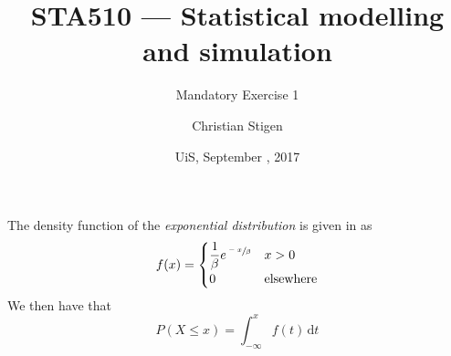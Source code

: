 \documentclass[a4paper,english,12pt]{article}
\title{STA510 --- Statistical modelling and simulation}
\subtitle{Mandatory Exercise 1}
\author{Christian Stigen}
\date{UiS, September \nth{21}, 2017}
\begin{document}
\maketitle

The density function of the \textit{exponential distribution} is given in
\cite{walpole} as
\[
  f(x) =
    \begin{cases}
      \displaystyle
        \frac{1}{\beta} e^{\sfrac{-x}{\beta}} & x > 0  \\
        0 & \text{elsewhere}
    \end{cases}
\]
We then have that
\[
  P(X \leqslant x) = \int_{-\infty}^{x} f(t)\, \mathrm{d}t
\]






\end{document}
